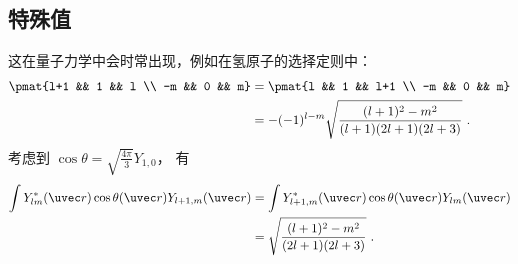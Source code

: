 \subsection{特殊值}
这在量子力学中会时常出现，例如在氢原子的选择定则中：
\begin{equation}\label{eq_ThreeJ_3}
\begin{aligned}
\pmat{l+1 && 1 && l \\ -m && 0 && m} &= \pmat{l && 1 && l+1 \\ -m && 0 && m}\\
&= -(-1)^{l-m} \sqrt{\frac{(l+1)^2-m^2}{(l+1)(2l+1)(2l+3)}}~.
\end{aligned}
\end{equation}
考虑到 $\cos\theta = \sqrt{\frac{4\pi}{3}}Y_{1,0}$， 有
\begin{equation}\label{eq_ThreeJ_4}
\begin{aligned}
\int Y_{l m}^* (\uvec r) \cos\theta (\uvec r) Y_{l+1, m}(\uvec r)
&= \int Y_{l+1, m}^* (\uvec r) \cos\theta (\uvec r) Y_{l m}(\uvec r)\\
&=  \sqrt{\frac{(l+1)^2-m^2}{(2l+1)(2l+3)}}~.
\end{aligned}
\end{equation}





